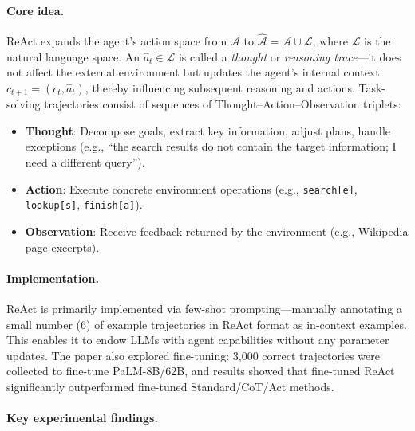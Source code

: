 \paragraph{Core idea.} ReAct expands the agent's action space from $\mathcal{A}$ to $\hat{\mathcal{A}} = \mathcal{A} \cup \mathcal{L}$, where $\mathcal{L}$ is the natural language space. An $\hat{a}_t \in \mathcal{L}$ is called a \emph{thought} or \emph{reasoning trace}---it does not affect the external environment but updates the agent's internal context $c_{t+1} = (c_t, \hat{a}_t)$, thereby influencing subsequent reasoning and actions. Task-solving trajectories consist of sequences of Thought--Action--Observation triplets:
\begin{itemize}[leftmargin=*]
  \item \textbf{Thought}: Decompose goals, extract key information, adjust plans, handle exceptions (e.g., ``the search results do not contain the target information; I need a different query'').
  \item \textbf{Action}: Execute concrete environment operations (e.g., \texttt{search[e]}, \texttt{lookup[s]}, \texttt{finish[a]}).
  \item \textbf{Observation}: Receive feedback returned by the environment (e.g., Wikipedia page excerpts).
\end{itemize}

\paragraph{Implementation.} ReAct is primarily implemented via few-shot prompting---manually annotating a small number (6) of example trajectories in ReAct format as in-context examples. This enables it to endow LLMs with agent capabilities without any parameter updates. The paper also explored fine-tuning: 3,000 correct trajectories were collected to fine-tune PaLM-8B/62B, and results showed that fine-tuned ReAct significantly outperformed fine-tuned Standard/CoT/Act methods.

\paragraph{Key experimental findings.}

